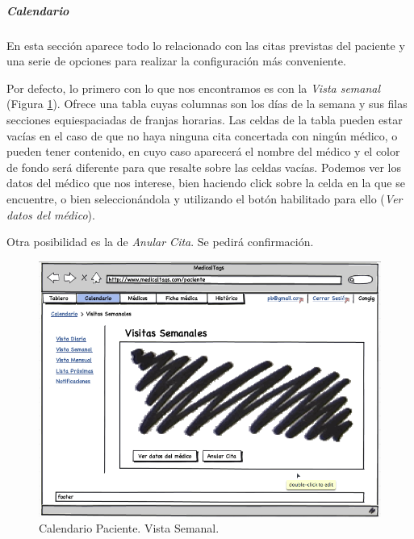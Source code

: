 		
		
		\subparagraph{Calendario} %
		\label{par:paciente_calendario}
		
		En esta sección aparece todo lo relacionado con las citas previstas del paciente y una serie de opciones para realizar la configuración  más conveniente.
		
		Por defecto, lo primero con lo que nos encontramos es con la \textit{Vista semanal} (Figura \ref{fig:iu_calendario_vista_semanal_paciente}). Ofrece una tabla cuyas columnas son los días de la semana y sus filas secciones equiespaciadas de franjas horarias. Las celdas de la tabla pueden estar vacías en el caso de que no haya ninguna cita concertada con ningún médico, o pueden tener contenido, en cuyo caso aparecerá el nombre del médico y el color de fondo será diferente para que resalte sobre las celdas vacías. Podemos ver los datos del médico que nos interese, bien haciendo click sobre la celda en la que se encuentre, o bien seleccionándola y utilizando el botón habilitado para ello (\textit{Ver datos del médico}). 
		
		Otra posibilidad es la de \textit{Anular Cita}. Se pedirá confirmación.			
		
		
		\begin{figure}[H]
		  \centering
		    \includegraphics[width=12cm]{img/png/interfaz/27_Calendario_Paciente.png}
		  \caption{Calendario Paciente. Vista Semanal.}
		  \label{fig:iu_calendario_vista_semanal_paciente}
		\end{figure}
		
